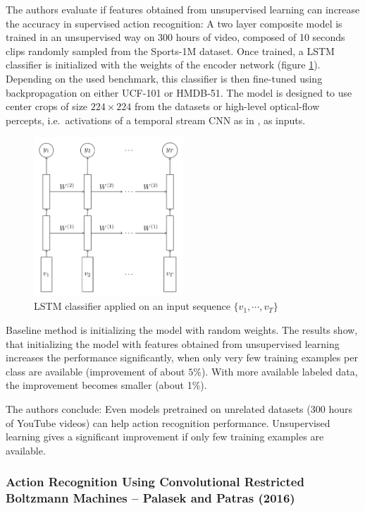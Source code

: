 The authors evaluate if features obtained from unsupervised learning can increase the accuracy in supervised action recognition:
A two layer composite model is trained in an unsupervised way on 300 hours of video, composed of 10 seconds clips randomly sampled from the Sports-1M dataset.
Once trained, a LSTM classifier is initialized with the weights of the encoder network (figure \ref{fig:unsupervisedlstms_classifier}).
Depending on the used benchmark, this classifier is then fine-tuned using backpropagation on either UCF-101 or HMDB-51.
The model is designed to use center crops of size $224 \times 224$ from the datasets or high-level optical-flow percepts, i.e.\ activations of a temporal stream CNN as in \cite{simonyan_two-stream_2014}, as inputs.

\begin{figure}[H]
    \centering
    \includegraphics[width=0.5\textwidth]{img_deep/unsupervisedlstms_classifier}
    \caption{LSTM classifier applied on an input sequence $\{v_1, \cdots, v_T\}$ \cite{srivastava_unsupervised_2015}}
    \label{fig:unsupervisedlstms_classifier}
\end{figure}

Baseline method is initializing the model with random weights.
The results show, that initializing the model with features obtained from unsupervised learning increases the performance significantly, when only very few training examples per class are available (improvement of about $5\%$).
With more available labeled data, the improvement becomes smaller (about 1\%).

The authors conclude: Even models pretrained on unrelated datasets (300 hours of YouTube videos) can help action recognition performance.
Unsupervised learning gives a significant improvement if only few training examples are available.


\subsubsection{Action Recognition Using Convolutional Restricted Boltzmann Machines -- Palasek and Patras (2016)}
\cite{palasek_action_2016}

